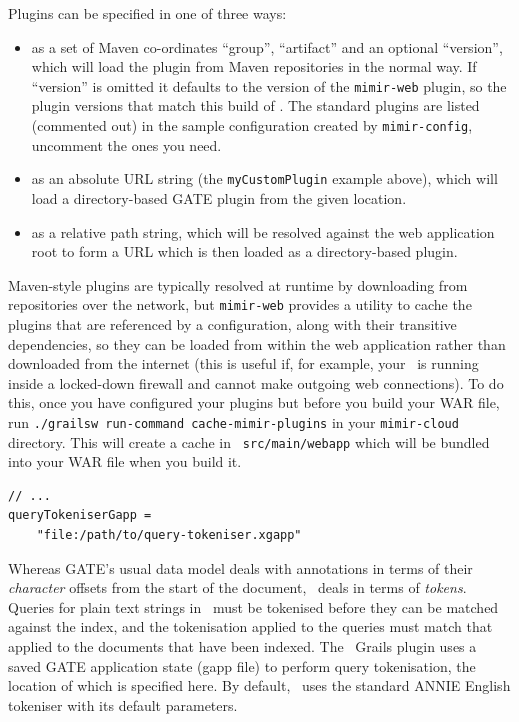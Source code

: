 Plugins can be specified in one of three ways:
\begin{itemize}
\item as a set of Maven co-ordinates ``group'', ``artifact'' and an optional
  ``version'', which will load the plugin from Maven repositories in the
  normal way.  If ``version'' is omitted it defaults to the version of the
  {\tt mimir-web} plugin, so the plugin versions that match this build of
  \Mimir{}.  The standard plugins are listed (commented out) in the sample
  configuration created by {\tt mimir-config}, uncomment the ones you need.
\item as an absolute URL string (the {\tt myCustomPlugin} example above),
  which will load a directory-based GATE plugin from the given location.
\item as a relative path string, which will be resolved against the web
  application root to form a URL which is then loaded as a directory-based
  plugin.
\end{itemize}

Maven-style plugins are typically resolved at runtime by downloading from
repositories over the network, but {\tt mimir-web} provides a utility to cache
the plugins that are referenced by a configuration, along with their transitive
dependencies, so they can be loaded from within the web application rather than
downloaded from the internet (this is useful if, for example, your \Mimir\ is
running inside a locked-down firewall and cannot make outgoing web
connections).  To do this, once you have configured your plugins but before you
build your WAR file, run {\tt ./grailsw run-command cache-mimir-plugins} in
your {\tt mimir-cloud} directory.  This will create a cache in {\tt
src/main/webapp} which will be bundled into your WAR file when you build it.

\begin{lstlisting}
// ...
queryTokeniserGapp = 
    "file:/path/to/query-tokeniser.xgapp"
\end{lstlisting}

Whereas GATE's usual data model deals with annotations in terms of their {\em
character} offsets from the start of the document, \Mimir\ deals in terms of
{\em tokens}.  Queries for plain text strings in \Mimir\ must be tokenised
before they can be matched against the index, and the tokenisation applied to
the queries must match that applied to the documents that have been indexed.
The \Mimir\ Grails plugin uses a saved GATE application state (gapp file) to
perform query tokenisation, the location of which is specified here.  By default,
\Mimir\ uses the standard ANNIE English tokeniser with its default parameters.

